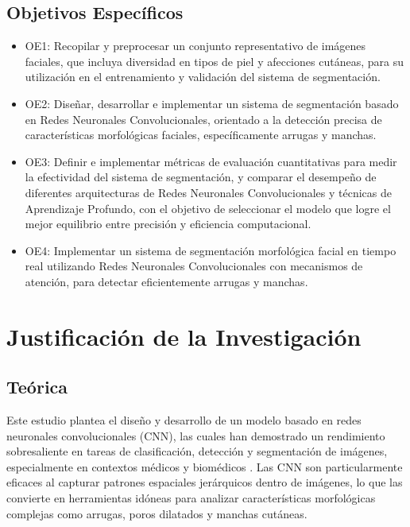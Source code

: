 \subsection{Objetivos Específicos}
\newcommand{\Objone}{
Recopilar y preprocesar un conjunto representativo de imágenes faciales, que incluya diversidad en tipos de piel y afecciones cutáneas, para su utilización en el entrenamiento y validación del sistema de segmentación.
}

\newcommand{\Objtwo}{
Diseñar, desarrollar e implementar un sistema de segmentación basado en Redes Neuronales Convolucionales, orientado a la detección precisa de características morfológicas faciales, específicamente arrugas y manchas.
}

\newcommand{\Objthree}{
Definir e implementar métricas de evaluación cuantitativas para medir la efectividad del sistema de segmentación, y comparar el desempeño de diferentes arquitecturas de Redes Neuronales Convolucionales y técnicas de Aprendizaje Profundo, con el objetivo de seleccionar el modelo que logre el mejor equilibrio entre precisión y eficiencia computacional.
}
\newcommand{\Objfour}{
Implementar un sistema de segmentación morfológica facial en tiempo real utilizando Redes Neuronales Convolucionales con mecanismos de atención, para detectar eficientemente arrugas y manchas.
}
\begin{itemize}
	\item OE1: {\Objone}
	\item OE2: {\Objtwo}
	\item OE3: {\Objthree}
	\item OE4: {\Objfour}
\end{itemize}


\section{Justificación de la Investigación}

\subsection{Teórica}

Este estudio plantea el diseño y desarrollo de un modelo basado en redes neuronales convolucionales (CNN), las cuales han demostrado un rendimiento sobresaliente en tareas de clasificación, detección y segmentación de imágenes, especialmente en contextos médicos y biomédicos \parencite{esteva2017}. Las CNN son particularmente eficaces al capturar patrones espaciales jerárquicos dentro de imágenes, lo que las convierte en herramientas idóneas para analizar características morfológicas complejas como arrugas, poros dilatados y manchas cutáneas.

